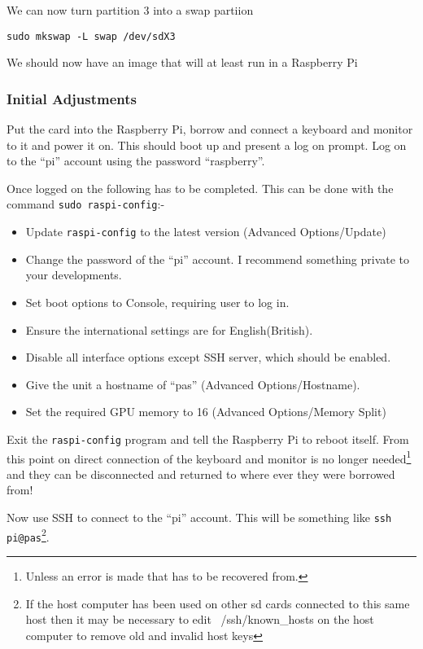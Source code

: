 \documentclass[Draft]{akc}
\begin{document}
We can now turn partition 3 into a swap partiion
\begin{lstlisting}
sudo mkswap -L swap /dev/sdX3
\end{lstlisting}

We should now have an image that will at least run in a Raspberry Pi

\subsubsection{Initial Adjustments}

Put the card into the Raspberry Pi, borrow and connect a keyboard and monitor to it and power it on.  This
should boot up and present a log on prompt. Log on to the ``pi'' account using the password ``raspberry''.

Once logged on the following has to be completed. This can be done with the command \texttt{sudo
raspi-config}:-

\begin{itemize}
\item Update \texttt{raspi-config} to the latest version (Advanced Options/Update)
\item Change the password of the ``pi'' account. I recommend something private to your developments.
\item Set boot options to Console, requiring user to log in.
\item Ensure the international settings are for English(British).
\item Disable all interface options except SSH server, which should be enabled.
\item Give the unit a hostname of ``pas'' (Advanced Options/Hostname).
\item Set the required GPU memory to 16  (Advanced Options/Memory Split)
\end{itemize}

Exit the \texttt{raspi-config} program and tell the Raspberry Pi to reboot itself.  From this point
on direct connection of the keyboard and monitor is no longer needed\footnote{Unless an error is
made that has to be recovered from.} and they can be disconnected and returned to where ever they
were borrowed from!

Now use SSH to connect to the ``pi'' account.  This will be something like \texttt{ssh pi@pas}\footnote{If
the host computer has been used on other sd cards connected to this same host then it may be necessary to
edit ~/ssh/known\_hosts on the host computer to remove old and invalid host keys}.
\end{document}
